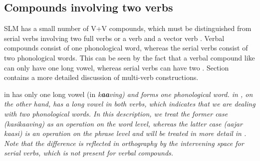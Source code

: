 \subsection{Compounds involving two verbs}\label{sec:wofo:Compoundsinvolvingtwoverbs}
SLM has a small number of V+V compounds, which must be distinguished from serial verbs involving two full verbs  or a verb and a vector verb . Verbal compounds consist of one phonological word, whereas the serial verbs consist of two phonological words. This can be seen by the fact that a verbal compound like  can only have one long vowel, whereas serial verbs can have two . Section  contains a more detailed discussion of multi-verb constructions.




 in  has only one long vowel (in \em k\textbf{aa}ving\em) and forms one phonological word.  in , on the other hand, has a long vowel in both verbs, which indicates that we are dealing with two phonological words. In this description, we treat the former case (\em kasikaaving\em) as an operation on the word level, whereas the latter case (\em aajar kaasi\em) is an operation on the phrase level and will be treated in more detail in . Note that the difference is reflected in orthography by the intervening space for serial verbs, which is not present for verbal compounds.


